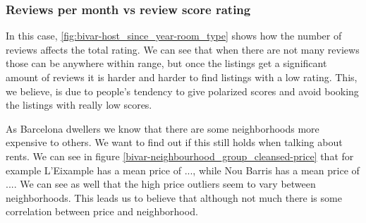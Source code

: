 \pagebreak
\subsubsection{Reviews per month vs review score rating}


 In this case, \cref{fig:bivar-host_since_year-room_type} shows how the number of reviews affects the total rating. We can see that when there are not many reviews those can be anywhere within range, but once the listings get a significant amount of reviews it is harder and harder to find listings with a low rating. This, we believe, is due to people's tendency to give polarized scores and avoid booking the listings with really low scores. 

\pagebreak
{} 
\pagebreak

As Barcelona dwellers we know that there are some neighborhoods more expensive to others. We want to find out
if this still holds when talking about \airbnb rents.
We can see in figure \cref{bivar-neighbourhood_group_cleansed-price} that for example L'Eixample has a mean price of ...,
while Nou Barris has a mean price of .... We can see as well
that the high price outliers seem to vary between neighborhoods. This leads us to believe that although not
much there is some correlation between price and neighborhood.


\pagebreak

\label{sub:bivariate_analysis}


